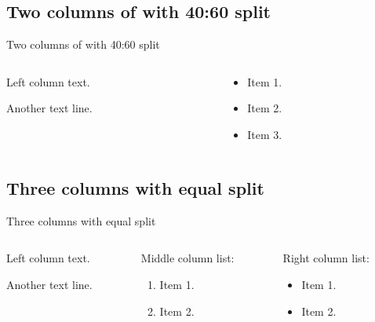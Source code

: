 \documentclass[
  ignorenonframetext,
  aspectratio=169,
  aspectratio=169]{beamer}
\providecommand{\tightlist}{%
  \setlength{\itemsep}{0pt}\setlength{\parskip}{0pt}}
\providecommand{\tightlist}{%
  \setlength{\itemsep}{0pt}\setlength{\parskip}{0pt}}
\begin{document}
\subsection{Two columns of with 40:60
split}\label{two-columns-of-with-4060-split}

\begin{frame}{Two columns of with 40:60 split}
\begin{columns}[T]
\begin{column}{0.4\textwidth}
Left column text.

Another text line.
\end{column}

\begin{column}{0.6\textwidth}
\begin{itemize}
\tightlist
\item
  Item 1.
\item
  Item 2.
\item
  Item 3.
\end{itemize}
\end{column}
\end{columns}
\end{frame}

\subsection{Three columns with equal
split}\label{three-columns-with-equal-split}

\begin{frame}{Three columns with equal split}
\begin{columns}[T]
\begin{column}{0.48\textwidth}
Left column text.

Another text line.
\end{column}

\begin{column}{0.48\textwidth}
Middle column list:

\begin{enumerate}
\tightlist
\item
  Item 1.
\item
  Item 2.
\end{enumerate}
\end{column}

\begin{column}{0.48\textwidth}
Right column list:

\begin{itemize}
\tightlist
\item
  Item 1.
\item
  Item 2.
\end{itemize}
\end{column}
\end{columns}
\end{frame}
\end{document}
